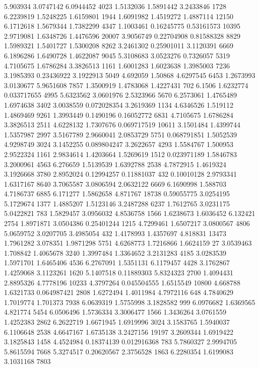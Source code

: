 5.903934 3.0747142 6.0944452 4023
1.5132036 1.5891442 3.2433846 1728
6.2239819 1.5248225 1.6159801 1944
1.6091982 1.4519272 1.4887114 12150
6.1712618 1.5679344 1.7382299 4347
1.1003461 0.16245775 0.53161573 10395
2.9719081 1.6348726 1.4476596 20007
3.9056749 0.22704908 0.81588328 8829
1.5989321 1.5401727 1.5300208 8262
3.2461302 0.25901011 3.1120391 6669
6.1896286 1.6490728 1.4622087 9045
5.3108683 3.0523276 0.7326057 5319
4.7105675 1.6786284 3.3826513 1161
1.6001283 1.6023638 1.3985003 7236
3.1985393 0.23436922 3.1922913 5049
4.692059 1.50868 4.6297545 6453
1.2673993 3.0130677 5.9651608 7857
1.3500919 1.4783068 1.4227431 702
6.1506 1.6232774 0.033717655 4995
5.6323562 3.0601976 2.5323966 5670
6.2573061 1.4765489 1.6974638 3402
3.0038559 0.072028354 3.2619369 1134
4.6346526 1.519112 1.4869469 9261
1.3993449 0.1490196 0.16052772 6831
4.7105675 1.6786284 3.3826513 2511
4.6228132 1.7307676 0.069717519 10611
3.1501484 1.4399744 1.5357987 2997
3.5167789 2.9660041 2.0853729 5751
0.068791851 1.5052539 4.9298749 3024
3.1452255 0.089804247 3.2622657 4293
1.5584767 1.500953 2.9522324 1161
2.9834614 1.4203664 1.5269619 1512
0.023971189 1.5846783 3.2000961 4563
6.276659 1.5139539 1.6392788 2538
4.7872915 1.4619324 3.1926668 3780
2.8952024 0.12994257 0.11881037 432
0.10010128 2.9793341 1.6317167 8640
3.7065587 3.0806594 2.0632122 6669
6.1690998 1.588703 4.7186737 6885
6.171277 1.5862658 4.871767 18738
0.59055775 3.0254195 5.1729674 1377
1.4885207 1.5123146 3.2487288 6237
1.7612765 3.0231175 5.0422821 783
1.5829457 3.0956032 4.8536758 1566
1.6238673 1.6036452 6.132421 2754
1.8971871 3.0504386 0.25401244 1215
4.7299461 1.6507217 3.0800567 4806
5.0659752 3.0207705 3.4985054 432
1.4178993 1.4357697 4.818831 13473
1.7961282 3.078351 1.9871298 5751
4.6268773 1.7216866 1.6624159 27
3.0539463 1.708842 1.4065678 3240
1.3997484 1.3364652 3.2131283 4185
3.0283539 1.5971701 1.6465406 4536
6.2767091 1.5351131 6.1179457 4428
3.1762867 1.4259068 3.1123261 1620
5.1407518 0.11889303 5.8324323 2700
1.4094431 2.8895326 4.7778196 10233
4.3797264 0.045504555 1.6515549 10800
4.668788 1.6321733 0.064987421 2808
1.6272494 1.4011984 4.7972116 648
4.7840629 1.7019774 1.701373 7938
6.0639319 1.5755998 3.1828582 999
6.0976682 1.6369565 4.821774 5454
6.0506496 1.5736334 3.3006477 1566
1.3436264 3.0761559 1.4252383 2862
6.2622719 1.6671945 1.6919996 3024
3.1583765 1.5940037 6.1106648 2538
4.6647167 1.6735138 3.2427156 19197
3.2609344 1.6919422 3.1825843 1458
4.4524984 0.18374139 0.012916368 783
5.7860327 2.9994705 5.8615594 7668
5.3274517 0.20620567 2.3756528 1863
6.2280354 1.6199083 3.1031168 7803

